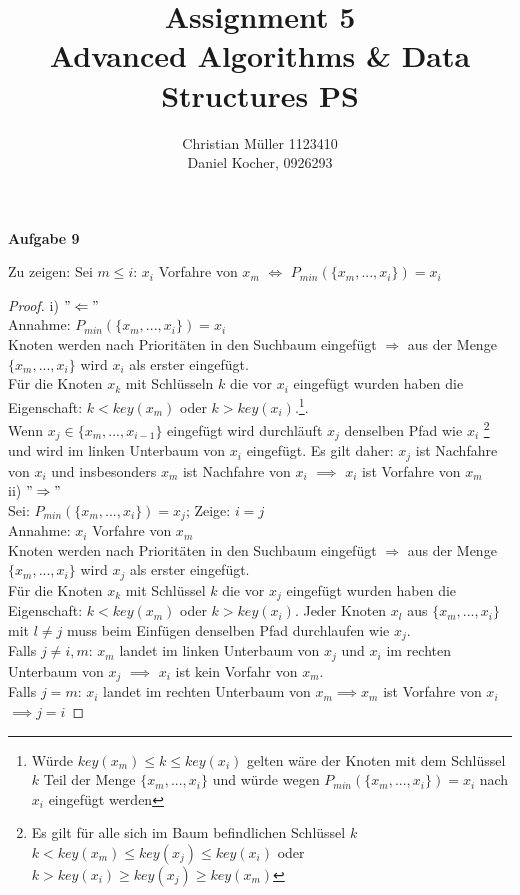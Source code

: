 \documentclass{article}
\begin{document}
\title{Assignment 5 \\ Advanced Algorithms \& Data Structures PS}%
\author{Christian Müller 1123410 \\ Daniel Kocher, 0926293}%
\maketitle

{\noindent\bfseries Aufgabe 9}%
\medskip%

 Zu zeigen: Sei $m \leq i$: $x_{i}$ Vorfahre von $x_{m}$ $\Leftrightarrow$ $P_{min}(\lbrace x_{m},...,x_{i} \rbrace)=x_{i}$ \\
\begin{proof}
\noindent

i) $"\Leftarrow"$\\
Annahme: $P_{min}(\lbrace x_{m},...,x_{i} \rbrace)=x_{i}$\\
Knoten werden nach Prioritäten in den Suchbaum eingefügt $\Rightarrow$ aus der Menge $\lbrace x_{m},...,x_{i} \rbrace$ wird $x_{i}$ als erster eingefügt.\\
Für die Knoten $x_{k}$ mit Schlüsseln $k$ die vor $x_{i}$ eingefügt wurden haben die Eigenschaft: $k < key(x_{m})$ oder $k > key(x_{i})$.\footnote[1]{Würde $key(x_{m}) \leq k \leq key(x_{i})$ gelten wäre der Knoten mit dem Schlüssel $k$ Teil der Menge $\lbrace x_{m},...,x_{i} \rbrace$ und würde wegen $P_{min}(\lbrace x_{m},...,x_{i} \rbrace)=x_{i}$ nach $x_{i}$ eingefügt werden}.\\
Wenn $x_{j} \in \lbrace x_{m},...,x_{i-1} \rbrace$ eingefügt wird durchläuft $x_{j}$ denselben Pfad wie $x_{i}$ \footnote[2]{Es gilt für alle sich im Baum befindlichen Schlüssel $k$ 
$k < key(x_{m}) \leq key(x_{j}) \leq key(x_{i})$  oder $k > key(x_{i}) \geq key(x_{j}) \geq key(x_{m})$ } und wird im linken Unterbaum von $x_{i}$ eingefügt. 
Es gilt daher: $x_{j}$ ist Nachfahre von $x_{i}$ und insbesonders $x_{m}$ ist Nachfahre von $x_{i}$ $\implies$ $x_{i}$ ist Vorfahre von $x_{m}$\\

ii) $"\Rightarrow"$\\
Sei: $P_{min}(\lbrace x_{m},...,x_{i} \rbrace)=x_{j}$; Zeige: $i=j$\\
Annahme: $x_{i}$ Vorfahre von $x_{m}$\\
Knoten werden nach Prioritäten in den Suchbaum eingefügt $\Rightarrow$ aus der Menge $\lbrace x_{m},...,x_{i} \rbrace$ wird $x_{j}$ als erster eingefügt.\\
Für die Knoten $x_{k}$ mit Schlüssel $k$ die vor $x_{j}$ eingefügt wurden haben die Eigenschaft: $k < key(x_{m})$ oder $k > key(x_{i})$.
Jeder Knoten $x_{l}$ aus $\lbrace x_{m},...,x_{i} \rbrace$ mit $l \neq j$ muss beim Einfügen denselben Pfad durchlaufen wie $x_{j}$.\\
Falls $j \neq i,m$: $x_{m}$ landet im linken Unterbaum von $x_{j}$ und $x_{i}$ im rechten Unterbaum von $x_{j}$ $\implies$ $x_{i}$ ist kein Vorfahr von $x_{m}$.\\
Falls $j=m$: $x_{i}$ landet im rechten Unterbaum von $x_{m} \implies x_{m}$ ist Vorfahre von $x_{i}$\\
$\implies j=i$ 
\end{proof}
\end{document}
